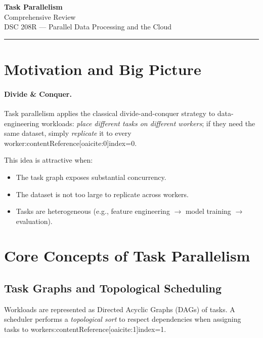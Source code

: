 \documentclass[11pt]{article}
\begin{document}
\begin{center}
  {\LARGE\bfseries Task Parallelism}\\[2mm]
  {\large Comprehensive Review}\\[1mm]
  {\normalsize DSC 208R — Parallel Data Processing and the Cloud}
\end{center}
\vspace{-0.6em}\hrule\vspace{0.9em}

\tableofcontents
\newpage

\section{Motivation and Big Picture}

\paragraph{Divide \& Conquer.}  
Task parallelism applies the classical divide-and-conquer strategy to data-engineering workloads: \emph{place different tasks on different workers}; if they need the same dataset, simply \emph{replicate} it to every worker:contentReference[oaicite:0]{index=0}.  

This idea is attractive when:  

\begin{itemize}[itemsep=0pt]
  \item The task graph exposes substantial concurrency.
  \item The dataset is not too large to replicate across workers.
  \item Tasks are heterogeneous (e.g., feature engineering $\rightarrow$ model training $\rightarrow$ evaluation).
\end{itemize}

\section{Core Concepts of Task Parallelism}

\subsection{Task Graphs and Topological Scheduling}

Workloads are represented as Directed Acyclic Graphs (DAGs) of tasks.  
A scheduler performs a \emph{topological sort} to respect dependencies when assigning tasks to workers:contentReference[oaicite:1]{index=1}.
\end{document}
